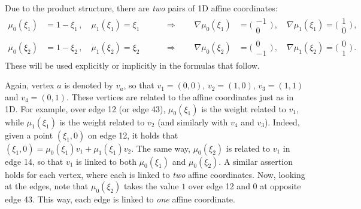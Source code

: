Due to the product structure, there are \textit{two} pairs of 1D affine coordinates:
\begin{equation}
    \begin{alignedat}{4}
        \mu_0(\xi_1)&=1-\xi_1\,,\quad \mu_1(\xi_1)=\xi_1\,\qquad&\Rightarrow\qquad
            \nabla\mu_0(\xi_1)&=\Big(\begin{smallmatrix}-1\\[2pt]0\end{smallmatrix}\Big)\,,\quad
                \nabla\mu_1(\xi_1)=\Big(\begin{smallmatrix}1\\[2pt]0\end{smallmatrix}\Big)\,,\\
        \mu_0(\xi_2)&=1-\xi_2\,,\quad \mu_1(\xi_2)=\xi_2\,\qquad&\Rightarrow\qquad
            \nabla\mu_0(\xi_2)&=\Big(\begin{smallmatrix}0\\[2pt]-1\end{smallmatrix}\Big)\,,\quad
                \nabla\mu_1(\xi_2)=\Big(\begin{smallmatrix}0\\[2pt]1\end{smallmatrix}\Big)\,.
    \end{alignedat}
\end{equation}
These will be used explicitly or implicitly in the formulas that follow.

Again, vertex $a$ is denoted by $v_a$, so that $v_1=(0,0)$, $v_2=(1,0)$, $v_3=(1,1)$ and $v_4=(0,1)$.
These vertices are related to the affine coordinates just as in 1D.
For example, over edge 12 (or edge 43), $\mu_0(\xi_1)$ is the weight related to $v_1$, while $\mu_1(\xi_1)$ is the weight related to $v_2$ (and similarly with $v_4$ and $v_3$).
Indeed, given a point $(\xi_1,0)$ on edge 12, it holds that $(\xi_1,0)=\mu_0(\xi_1)v_1+\mu_1(\xi_1)v_2$.
The same way, $\mu_0(\xi_2)$ is related to $v_1$ in edge 14, so that $v_1$ is linked to both $\mu_0(\xi_1)$ and $\mu_0(\xi_2)$.
A similar assertion holds for each vertex, where each is linked to \textit{two} affine coordinates.
Now, looking at the edges, note that $\mu_0(\xi_2)$ takes the value $1$ over edge 12 and $0$ at opposite edge 43.
This way, each edge is linked to \textit{one} affine coordinate.

